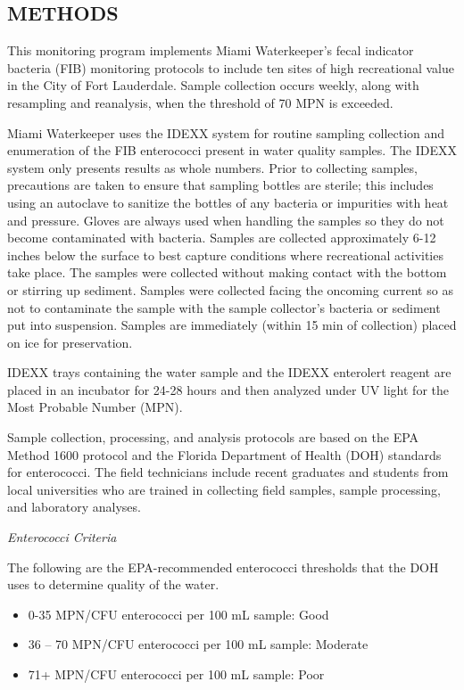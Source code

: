 \documentclass[
]{article}
\providecommand{\tightlist}{%
  \setlength{\itemsep}{0pt}\setlength{\parskip}{0pt}}
\begin{document}
\hypertarget{methods}{%
\subsection{METHODS}\label{methods}}

This monitoring program implements Miami Waterkeeper's fecal indicator
bacteria (FIB) monitoring protocols to include ten sites of high
recreational value in the City of Fort Lauderdale. Sample collection
occurs weekly, along with resampling and reanalysis, when the threshold
of 70 MPN is exceeded.

Miami Waterkeeper uses the IDEXX system for routine sampling collection
and enumeration of the FIB enterococci present in water quality samples.
The IDEXX system only presents results as whole numbers. Prior to
collecting samples, precautions are taken to ensure that sampling
bottles are sterile; this includes using an autoclave to sanitize the
bottles of any bacteria or impurities with heat and pressure. Gloves are
always used when handling the samples so they do not become contaminated
with bacteria. Samples are collected approximately 6-12 inches below the
surface to best capture conditions where recreational activities take
place. The samples were collected without making contact with the bottom
or stirring up sediment. Samples were collected facing the oncoming
current so as not to contaminate the sample with the sample collector's
bacteria or sediment put into suspension. Samples are immediately
(within 15 min of collection) placed on ice for preservation.

IDEXX trays containing the water sample and the IDEXX enterolert reagent
are placed in an incubator for 24-28 hours and then analyzed under UV
light for the Most Probable Number (MPN).

Sample collection, processing, and analysis protocols are based on the
EPA Method 1600 protocol and the Florida Department of Health (DOH)
standards for enterococci. The field technicians include recent
graduates and students from local universities who are trained in
collecting field samples, sample processing, and laboratory analyses.

\emph{Enterococci Criteria}

The following are the EPA-recommended enterococci thresholds that the
DOH uses to determine quality of the water.

\begin{itemize}
\tightlist
\item
  0-35 MPN/CFU enterococci per 100 mL sample: Good
\item
  36 -- 70 MPN/CFU enterococci per 100 mL sample: Moderate
\item
  71+ MPN/CFU enterococci per 100 mL sample: Poor
\end{itemize}
\end{document}
